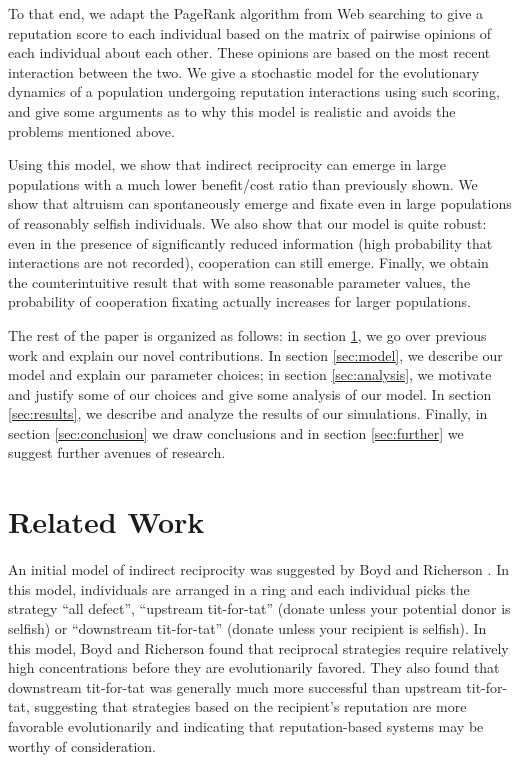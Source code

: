 \documentclass{amsart}
\begin{document}
To that end, we adapt the PageRank algorithm from Web searching to
give a reputation score to each individual based on the matrix of
pairwise opinions of each individual about each other. These opinions
are based on the most recent interaction between the two. We give a
stochastic model for the evolutionary dynamics of a population
undergoing reputation interactions using such scoring, and give some
arguments as to why this model is realistic and avoids the problems
mentioned above.

Using this model, we show that indirect reciprocity can emerge in
large populations with a much lower benefit/cost ratio than previously
shown. We show that altruism can spontaneously emerge and fixate even
in large populations of reasonably selfish individuals. We also show
that our model is quite robust: even in the presence of significantly
reduced information (high probability that interactions are not
recorded), cooperation can still emerge. Finally, we obtain the
counterintuitive result that with some reasonable parameter values,
the probability of cooperation fixating actually increases for larger
populations.

The rest of the paper is organized as follows: in section
\ref{sec:related}, we go over previous work and explain our novel
contributions. In section \ref{sec:model}, we describe our model and
explain our parameter choices; in section \ref{sec:analysis}, we
motivate and justify some of our choices and give some analysis of our
model. In section \ref{sec:results}, we describe and analyze the
results of our simulations. Finally, in section \ref{sec:conclusion}
we draw conclusions and in section \ref{sec:further} we suggest
further avenues of research.

\section{Related Work}\label{sec:related}

An initial model of indirect reciprocity was suggested by Boyd and
Richerson \cite{boyd_evolution_1989}. In this model, individuals are
arranged in a ring and each individual picks the strategy ``all
defect'', ``upstream tit-for-tat'' (donate unless your potential donor
is selfish) or ``downstream tit-for-tat'' (donate unless your
recipient is selfish). In this model, Boyd and Richerson found that
reciprocal strategies require relatively high concentrations before
they are evolutionarily favored. They also found that downstream
tit-for-tat was generally much more successful than upstream
tit-for-tat, suggesting that strategies based on the recipient's
reputation are more favorable evolutionarily and indicating that
reputation-based systems may be worthy of consideration.
\end{document}
